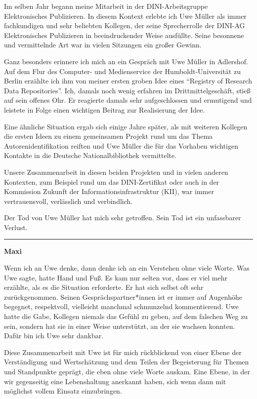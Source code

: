 \documentclass[a4paper,
fontsize=11pt,
oneside,
numbers=noperiodatend,
parskip=half-,
bibliography=totoc,
final
]{scrartcl}
\begin{document}
Im selben Jahr begann meine Mitarbeit in der DINI-Arbeitsgruppe
Elektronisches Publizieren. In diesem Kontext erlebte ich Uwe Müller als
immer fachkundigen und sehr beliebten Kollegen, der seine Sprecherrolle
der DINI-AG Elektronisches Publizieren in beeindruckender Weise
ausfüllte. Seine besonnene und vermittelnde Art war in vielen Sitzungen
ein großer Gewinn.

Ganz besonders erinnere ich mich an ein Gespräch mit Uwe Müller in
Adlershof. Auf dem Flur des Computer- und Medienservice der
Humboldt-Universität zu Berlin erzählte ich ihm von meiner ersten groben
Idee eines \enquote{Registry of Research Data Repositories}. Ich, damals
noch wenig erfahren im Drittmittelgeschäft, stieß auf sein offenes Ohr.
Er reagierte damals sehr aufgeschlossen und ermutigend und leistete in
Folge einen wichtigen Beitrag zur Realisierung der Idee.

Eine ähnliche Situation ergab sich einige Jahre später, als mit weiteren
Kollegen die ersten Ideen zu einem gemeinsamen Projekt rund um das Thema
Autorenidentifikation reiften und Uwe Müller die für das Vorhaben
wichtigen Kontakte in die Deutsche Nationalbibliothek vermittelte.

Unsere Zusammenarbeit in diesen beiden Projekten und in vielen anderen
Kontexten, zum Beispiel rund um das DINI-Zertifikat oder auch in der
Kommission Zukunft der Informationsinfrastruktur (KII), war immer
vertrauensvoll, verlässlich und verbindlich.

Der Tod von Uwe Müller hat mich sehr getroffen. Sein Tod ist ein
unfassbarer Verlust.

\begin{center}\rule{0.5\linewidth}{0.5pt}\end{center}

\textbf{Maxi}

Wenn ich an Uwe denke, dann denke ich an ein Verstehen ohne viele Worte.
Was Uwe sagte, hatte Hand und Fuß. Es kam nur selten vor, dass er viel
mehr erzählte, als es die Situation erforderte. Er hat sich selbst oft
sehr zurückgenommen. Seinen Gesprächspartner*innen ist er immer auf
Augenhöhe begegnet, respektvoll, vielleicht manchmal schmunzelnd
kommentierend. Uwe hatte die Gabe, Kollegen niemals das Gefühl zu geben,
auf dem falschen Weg zu sein, sondern hat sie in einer Weise
unterstützt, an der sie wachsen konnten. Dafür bin ich Uwe sehr dankbar.

Diese Zusammenarbeit mit Uwe ist für mich rückblickend von einer Ebene
der Verständigung und Wertschätzung und dem Teilen der Begeisterung für
Themen und Standpunkte geprägt, die eben ohne viele Worte auskam. Eine
Ebene, in der wir gegenseitig eine Lebenshaltung anerkannt haben, sich
wenn dann mit möglichst vollem Einsatz einzubringen.
\end{document}
